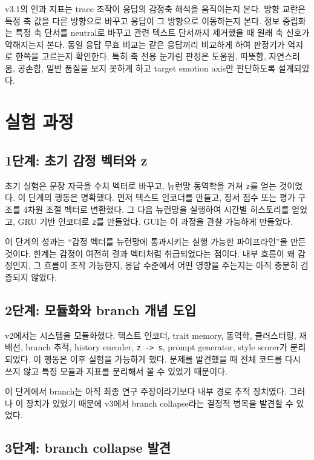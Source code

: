 \documentclass[11pt,a4paper]{article}
\newcommand{\eng}[1]{\texttt{#1}}
\begin{document}
v3.1의 인과 지표는 trace 조작이 응답의 감정축 해석을 움직이는지 본다. 방향 교란은 특정 축 값을 다른 방향으로 바꾸고 응답이 그 방향으로 이동하는지 본다. 정보 중립화는 특정 축 단서를 neutral로 바꾸고 관련 텍스트 단서까지 제거했을 때 원래 축 신호가 약해지는지 본다. 동일 응답 무효 비교는 같은 응답끼리 비교하게 하여 판정기가 억지로 한쪽을 고르는지 확인한다. 특히 축 전용 눈가림 판정은 도움됨, 따뜻함, 자연스러움, 공손함, 일반 품질을 보지 못하게 하고 target emotion axis만 판단하도록 설계되었다.

\section{실험 과정}

\subsection{1단계: 초기 감정 벡터와 z}

초기 실험은 문장 자극을 수치 벡터로 바꾸고, 뉴런망 동역학을 거쳐 \eng{z}를 얻는 것이었다. 이 단계의 행동은 명확했다. 먼저 텍스트 인코더를 만들고, 정서 점수 또는 평가 구조를 4차원 조절 벡터로 변환했다. 그 다음 뉴런망을 실행하여 시간별 히스토리를 얻었고, GRU 기반 인코더로 \eng{z}를 만들었다. GUI는 이 과정을 관찰 가능하게 만들었다.

이 단계의 성과는 ``감정 벡터를 뉴런망에 통과시키는 실행 가능한 파이프라인''을 만든 것이다. 한계는 감정이 여전히 결과 벡터처럼 취급되었다는 점이다. 내부 흐름이 왜 감정인지, 그 흐름이 조작 가능한지, 응답 수준에서 어떤 영향을 주는지는 아직 충분히 검증되지 않았다.

\subsection{2단계: 모듈화와 branch 개념 도입}

v2에서는 시스템을 모듈화했다. 텍스트 인코더, trait memory, 동역학, 클러스터링, 재배선, branch 추적, history encoder, \eng{z -> s}, prompt generator, style scorer가 분리되었다. 이 행동은 이후 실험을 가능하게 했다. 문제를 발견했을 때 전체 코드를 다시 쓰지 않고 특정 모듈과 지표를 분리해서 볼 수 있었기 때문이다.

이 단계에서 branch는 아직 최종 연구 주장이라기보다 내부 경로 추적 장치였다. 그러나 이 장치가 있었기 때문에 v3에서 branch collapse라는 결정적 병목을 발견할 수 있었다.

\subsection{3단계: branch collapse 발견}
\end{document}
